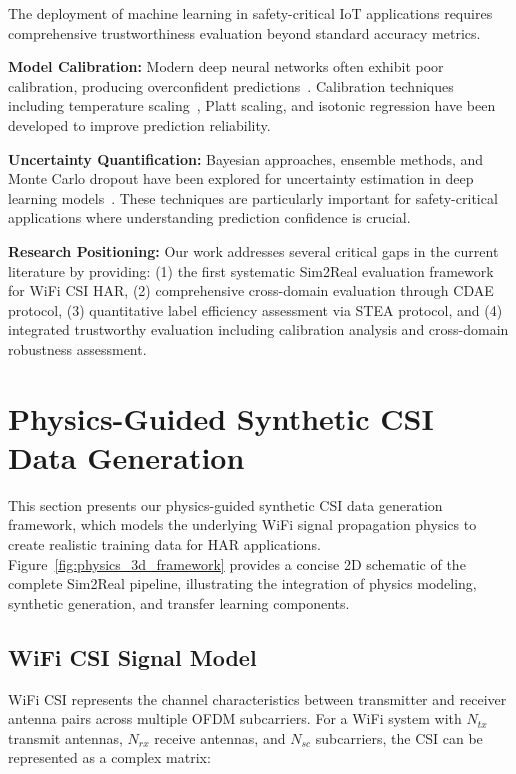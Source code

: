 \documentclass[journal]{IEEEtran}
\begin{document}
The deployment of machine learning in safety-critical IoT applications requires comprehensive trustworthiness evaluation beyond standard accuracy metrics.

\textbf{Model Calibration:} Modern deep neural networks often exhibit poor calibration, producing overconfident predictions~\cite{calibration_guo2017}. Calibration techniques including temperature scaling~\cite{temperature_scaling2017}, Platt scaling, and isotonic regression have been developed to improve prediction reliability.

\textbf{Uncertainty Quantification:} Bayesian approaches, ensemble methods, and Monte Carlo dropout have been explored for uncertainty estimation in deep learning models~\cite{reliability_assessment2019}. These techniques are particularly important for safety-critical applications where understanding prediction confidence is crucial.

\textbf{Research Positioning:} Our work addresses several critical gaps in the current literature by providing: (1) the first systematic Sim2Real evaluation framework for WiFi CSI HAR, (2) comprehensive cross-domain evaluation through CDAE protocol, (3) quantitative label efficiency assessment via STEA protocol, and (4) integrated trustworthy evaluation including calibration analysis and cross-domain robustness assessment.

\section{Physics-Guided Synthetic CSI Data Generation}

This section presents our physics-guided synthetic CSI data generation framework, which models the underlying WiFi signal propagation physics to create realistic training data for HAR applications. Figure~\ref{fig:physics_3d_framework} provides a concise 2D schematic of the complete Sim2Real pipeline, illustrating the integration of physics modeling, synthetic generation, and transfer learning components.

\subsection{WiFi CSI Signal Model}

WiFi CSI represents the channel characteristics between transmitter and receiver antenna pairs across multiple OFDM subcarriers. For a WiFi system with $N_{tx}$ transmit antennas, $N_{rx}$ receive antennas, and $N_{sc}$ subcarriers, the CSI can be represented as a complex matrix:
\end{document}
